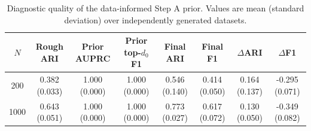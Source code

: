 \begin{table}[t]
\centering
\caption{Diagnostic quality of the data-informed Step A prior. Values are mean (standard deviation) over independently generated datasets.}
\label{tab:stepA_prior_diagnostics}
\begin{tabular}{cccccccc}
\toprule
$N$ & Rough ARI & Prior AUPRC & Prior top-$d_0$ F1 & Final ARI & Final F1 & $\Delta$ARI & $\Delta$F1 \\
\midrule
200 & 0.382 (0.033) & 1.000 (0.000) & 1.000 (0.000) & 0.546 (0.140) & 0.414 (0.050) & 0.164 (0.137) & -0.295 (0.071) \\
1000 & 0.643 (0.051) & 1.000 (0.000) & 1.000 (0.000) & 0.773 (0.027) & 0.617 (0.072) & 0.130 (0.050) & -0.349 (0.082) \\
\bottomrule
\end{tabular}
\end{table}